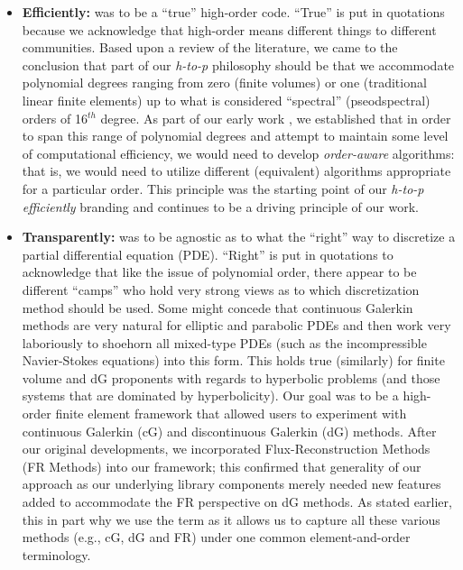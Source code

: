 \begin{itemize}
\item \textbf{Efficiently:} {\nek} was to be a ``true'' high-order code.  ``True'' is put in quotations because we acknowledge
that high-order means different things to different communities.  Based upon a review of the literature, we 
came to the conclusion that part of our {\em h-to-p} philosophy should be that we accommodate polynomial
degrees ranging from zero (finite volumes) or one (traditional linear finite elements) up to what is considered
``spectral'' (pseodspectral) orders of 16$^{th}$ degree.  As part of our early work \cite{VosSK2010}, we established that in
order to span this range of polynomial degrees and attempt to maintain some level of computational 
efficiency, we would need to develop {\em order-aware} algorithms:  that is, we would need to utilize
different (equivalent) algorithms appropriate for a particular order.  This principle was the starting point
of our {\em h-to-p efficiently} branding and continues to be a driving principle of our work. 

\item \textbf{Transparently:} {\nek} was to be agnostic as to what the ``right'' way to discretize a partial differential equation (PDE).
``Right'' is put in quotations to acknowledge that like the issue of polynomial order, there appear to be different
``camps'' who hold very strong views as to which discretization method should be used.   Some might concede that
continuous Galerkin methods are very natural for elliptic and parabolic PDEs and then work very laboriously to 
shoehorn all mixed-type PDEs (such as the incompressible Navier-Stokes equations) into this form.  This holds
true (similarly) for finite volume and dG proponents with regards to hyperbolic problems (and those systems that are
dominated by hyperbolicity).  Our goal was to be a high-order finite element framework that allowed users to experiment with
continuous Galerkin (cG) and discontinuous Galerkin (dG) methods.  After our original developments, we incorporated 
Flux-Reconstruction Methods (FR Methods) into our framework; this confirmed that generality of our approach as our
underlying library components merely needed new features added to accommodate the FR perspective on dG methods.
As stated earlier, this in part why we use the term \shp as it allows us to capture all these various methods (e.g., cG, dG and FR)
under one common element-and-order terminology.


\end{itemize}
